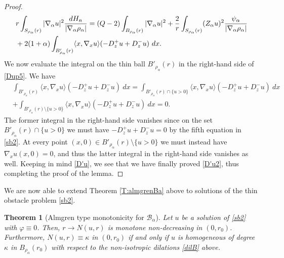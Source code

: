 \documentclass[11pt]{amsart}
\theoremstyle{plain}
\newtheorem{thrm}{Theorem}[section]
\numberwithin{equation}{section}
\begin{document}
\begin{proof}
\begin{align}
& r \int_{S_{\rho_\alpha}(r)} |{\nabla_\alpha} u|^2 \frac{dH_n}{|{\nabla_\alpha} \rho_\alpha|} = (Q - 2) \int_{B_{\rho_\alpha}(r)} |{\nabla_\alpha} u|^2 + \frac 2r \int_{S_{\rho_\alpha}(r)}  (Z_\alpha u)^2 \frac{\psi_\alpha}{|{\nabla_\alpha} \rho_\alpha|}
\\
&
+ 2 (1+\alpha) \int_{B'_{\rho_\alpha}(r)}  \langle x,\nabla_x u\rangle (-D_z^+ u + D^-_z u)\ dx.
\notag
\end{align}
We now evaluate the integral on the thin ball  $B'_{\rho_\alpha}(r)$ in the right-hand side of \eqref{Dup5}. We have
\begin{align*}
& \int_{B'_{\rho_\alpha}(r)}  \langle x,\nabla_x u\rangle (-D_z^+ u + D^-_z u)\ dx = \int_{B'_{\rho_\alpha}(r)\cap \{u>0\}}  \langle x,\nabla_x u\rangle (-D_z^+ u + D^-_z u)\ dx
\\
& + \int_{B'_{\rho_\alpha}(r)\setminus \{u>0\}}  \langle x,\nabla_x u\rangle (-D_z^+ u + D^-_z u)\ dx =  0.
\end{align*}
The former integral in the right-hand side vanishes since on the set $B'_{\rho_\alpha}(r)\cap \{u>0\}$ we must have $-D_z^+ u + D^-_z u = 0$ by the fifth equation in \eqref{sb2}. At every point $(x,0)\in B'_{\rho_\alpha}(r)\setminus \{u>0\}$ we must instead have $\nabla_x u(x,0) = 0$, and thus the latter integral in the right-hand side vanishes as well. Keeping in mind \eqref{D'u}, we see that we have finally proved \eqref{D'u2}, thus completing the proof of the lemma.

\end{proof}

We are now able to extend Theorem \ref{T:almgrenBa} above to solutions of the thin obstacle problem \eqref{sb2}.

\begin{thrm}[Almgren type monotonicity for ${\mathcal{B}_\alpha}$]\label{T:almgrenbgo}
Let $u$ be a solution of \eqref{sb2} with ${\varphi}\equiv 0$. Then, $r\to N(u,r)$ is monotone non-decreasing in $(0,r_0)$. Furthermore, $N(u,r) \equiv \kappa$ in $(0,r_0)$ if and only if $u$ is homogeneous of degree $\kappa$ in $B_{\rho_\alpha}(r_0)$ with respect to the non-isotropic dilations \eqref{dilB} above.
\end{thrm}
\end{document}
